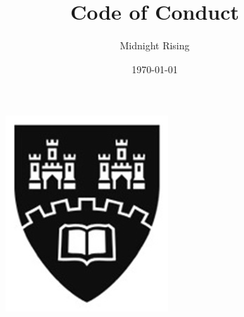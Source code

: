 \documentclass[11pt]{article}
\begin{document}

\begin{figure}[t]
	\includegraphics[scale=0.75]{northumbria_logo.jpg}
	\centering
\end{figure}	
\title{Code of Conduct}
\author{Midnight Rising}
\date{\today}
\maketitle

\newpage

%	
\end{document}
